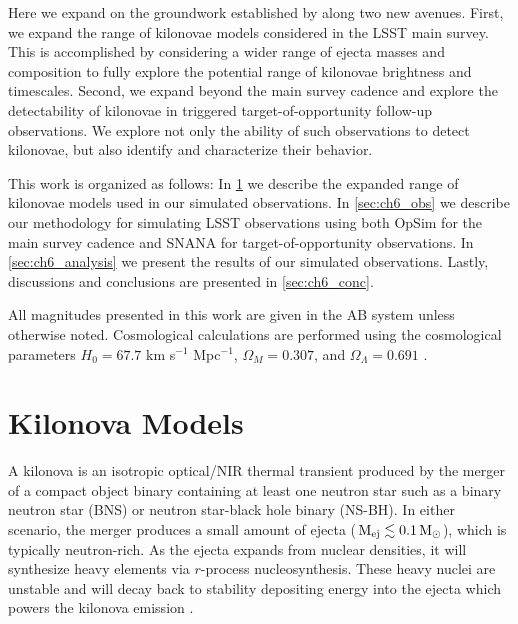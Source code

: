 Here we expand on the groundwork established by \citet{Scolnic+18} along two new avenues. First, we expand the range of kilonovae models considered in the LSST main survey. This is accomplished by considering a wider range of ejecta masses and composition to fully explore the potential range of kilonovae brightness and timescales. Second, we expand beyond the main survey cadence and explore the detectability of kilonovae in triggered target-of-opportunity follow-up observations. We explore not only the ability of such observations to detect kilonovae, but also identify and characterize their behavior. 

This work is organized as follows: In \cref{sec:ch6_models} we describe the expanded range of kilonovae models used in our simulated observations. In \cref{sec:ch6_obs} we describe our methodology for simulating LSST observations using both OpSim for the main survey cadence and SNANA for target-of-opportunity observations. In \cref{sec:ch6_analysis} we present the results of our simulated observations. Lastly, discussions and conclusions are presented in \cref{sec:ch6_conc}.

All magnitudes presented in this work are given in the AB system unless otherwise noted. Cosmological calculations are performed using the cosmological parameters $H_0 = 67.7$ km s$^{-1}$ Mpc$^{-1}$, $\Omega_M = 0.307$, and $\Omega_{\Lambda} = 0.691$ \citep{Planck2016}.

\clearpage
\section{Kilonova Models}
\label{sec:ch6_models}
A kilonova is an isotropic optical/NIR thermal transient produced by the merger of a compact object binary containing at least one neutron star such as a binary neutron star (BNS) or neutron star-black hole binary (NS-BH). In either scenario, the merger produces a small amount of ejecta ($\rm\,M_{\rm ej} \lesssim 0.1 {\rm\,M_\odot}$), which is typically neutron-rich. As the ejecta expands from nuclear densities, it will synthesize heavy elements via $r$-process nucleosynthesis. These heavy nuclei are unstable and will decay back to stability depositing energy into the ejecta which powers the kilonova emission \citep{LP98,Metzger+10,BarnesKasen13,TanakaHotokezaka13,Metzger2017}.

